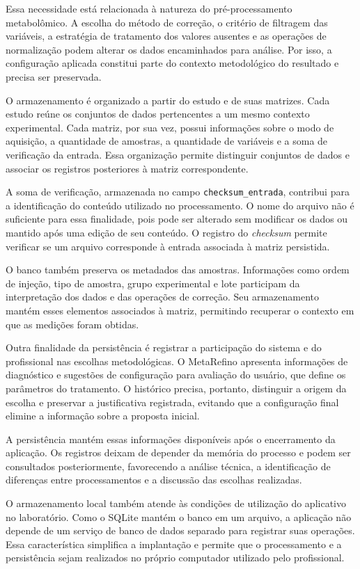 Essa necessidade está relacionada à natureza do pré-processamento metabolômico. A escolha do método de correção, o critério de filtragem das variáveis, a estratégia de tratamento dos valores ausentes e as operações de normalização podem alterar os dados encaminhados para análise. Por isso, a configuração aplicada constitui parte do contexto metodológico do resultado e precisa ser preservada.

O armazenamento é organizado a partir do estudo e de suas matrizes. Cada estudo reúne os conjuntos de dados pertencentes a um mesmo contexto experimental. Cada matriz, por sua vez, possui informações sobre o modo de aquisição, a quantidade de amostras, a quantidade de variáveis e a soma de verificação da entrada. Essa organização permite distinguir conjuntos de dados e associar os registros posteriores à matriz correspondente.

A soma de verificação, armazenada no campo \texttt{checksum\_entrada}, contribui para a identificação do conteúdo utilizado no processamento. O nome do arquivo não é suficiente para essa finalidade, pois pode ser alterado sem modificar os dados ou mantido após uma edição de seu conteúdo. O registro do \textit{checksum} permite verificar se um arquivo corresponde à entrada associada à matriz persistida.

O banco também preserva os metadados das amostras. Informações como ordem de injeção, tipo de amostra, grupo experimental e lote participam da interpretação dos dados e das operações de correção. Seu armazenamento mantém esses elementos associados à matriz, permitindo recuperar o contexto em que as medições foram obtidas.

Outra finalidade da persistência é registrar a participação do sistema e do profissional nas escolhas metodológicas. O MetaRefino apresenta informações de diagnóstico e sugestões de configuração para avaliação do usuário, que define os parâmetros do tratamento. O histórico precisa, portanto, distinguir a origem da escolha e preservar a justificativa registrada, evitando que a configuração final elimine a informação sobre a proposta inicial.

A persistência mantém essas informações disponíveis após o encerramento da aplicação. Os registros deixam de depender da memória do processo e podem ser consultados posteriormente, favorecendo a análise técnica, a identificação de diferenças entre processamentos e a discussão das escolhas realizadas.

O armazenamento local também atende às condições de utilização do aplicativo no laboratório. Como o SQLite mantém o banco em um arquivo, a aplicação não depende de um serviço de banco de dados separado para registrar suas operações. Essa característica simplifica a implantação e permite que o processamento e a persistência sejam realizados no próprio computador utilizado pelo profissional.

